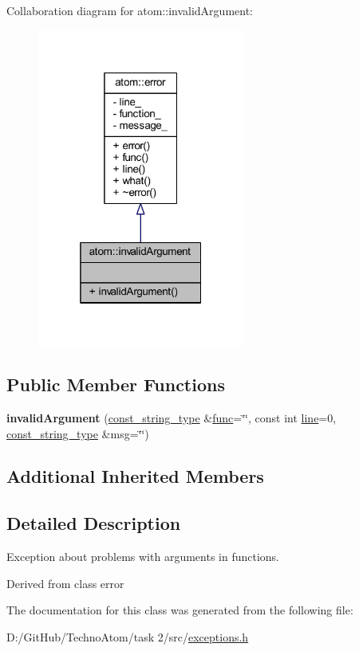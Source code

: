 Collaboration diagram for atom\+:\+:invalid\+Argument\+:
\nopagebreak
\begin{figure}[H]
\begin{center}
\leavevmode
\includegraphics[width=193pt]{classatom_1_1invalid_argument__coll__graph}
\end{center}
\end{figure}
\subsection*{Public Member Functions}
\begin{DoxyCompactItemize}
\item 
\mbox{\label{classatom_1_1invalid_argument_a21255e405e4aa56098092b4ac75d53e4}} 
{\bfseries invalid\+Argument} (\hyperlink{classatom_1_1error_ac330e9fb7cedcf4a173c5eb156d7bdaf}{const\+\_\+string\+\_\+type} \&\hyperlink{classatom_1_1error_a0a70a92b1638bfe4be7972651ae0c5c8}{func}=\char`\"{}\char`\"{}, const int \hyperlink{classatom_1_1error_aa9443d1a458d0dc6086372444a58e8c6}{line}=0, \hyperlink{classatom_1_1error_ac330e9fb7cedcf4a173c5eb156d7bdaf}{const\+\_\+string\+\_\+type} \&msg=\char`\"{}\char`\"{})
\end{DoxyCompactItemize}
\subsection*{Additional Inherited Members}


\subsection{Detailed Description}
Exception about problems with arguments in functions. 

Derived from class error 

The documentation for this class was generated from the following file\+:\begin{DoxyCompactItemize}
\item 
D\+:/\+Git\+Hub/\+Techno\+Atom/task 2/src/\hyperlink{exceptions_8h}{exceptions.\+h}\end{DoxyCompactItemize}

